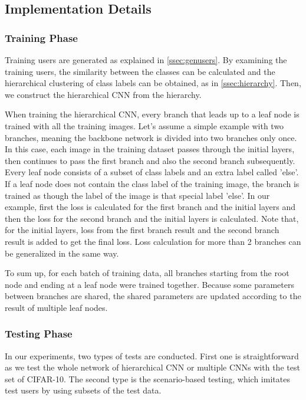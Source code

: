 \subsection{Implementation Details}

\subsubsection*{Training Phase}
Training users are generated as explained in \ref{ssec:genusers}. 
By examining the training users, the similarity between the classes can be calculated and the hierarchical clustering of class labels can be obtained, as in \ref{ssec:hierarchy}. 
Then, we construct the hierarchical CNN from the hierarchy.

When training the hierarchical CNN, every branch that leads up to a leaf node is trained with all the training images. 
Let's assume a simple example with two branches, meaning the backbone network is divided into two branches only once.
In this case, each image in the training dataset passes through the initial layers, then continues to pass the first branch and also the second branch subsequently.
Every leaf node consists of a subset of class labels and an extra label called 'else'. 
If a leaf node does not contain the class label of the training image, the branch is trained as though the label of the image is that special label 'else'. 
In our example, first the loss is calculated for the first branch and the initial layers and then the loss for the second branch and the initial layers is calculated. 
Note that, for the initial layers, loss from the first branch result and the second branch result is added to get the final loss. 
Loss calculation for more than 2 branches can be generalized in the same way.

To sum up, for each batch of training data, all branches starting from the root node and ending at a leaf node were trained together. Because some parameters between branches are shared, the shared parameters are updated according to the result of multiple leaf nodes.

\subsubsection*{Testing Phase}
In our experiments, two types of tests are conducted. 
First one is straightforward as we test the whole network of hierarchical CNN or multiple CNNs with the test set of CIFAR-10. 
The second type is the scenario-based testing, which imitates test users by using subsets of the test data.

